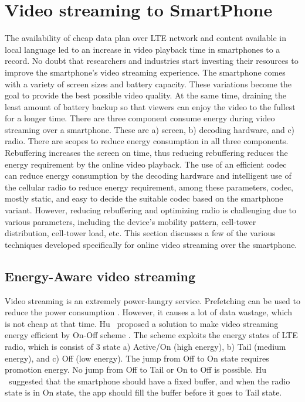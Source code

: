 \section{Video streaming to SmartPhone}
The availability of cheap data plan over LTE network and content available in local language led to an increase in video playback time in smartphones to a record. No doubt that researchers and industries start investing their resources to improve the smartphone's video streaming experience. The smartphone comes with a variety of screen sizes and battery capacity. These variations become the goal to provide the best possible video quality. At the same time, draining the least amount of battery backup so that viewers can enjoy the video to the fullest for a longer time. There are three component consume energy during video streaming over a smartphone. These are a) screen, b) decoding hardware, and c) radio. There are scopes to reduce energy consumption in all three components. Rebuffering increases the screen on time, thus reducing rebuffering reduces the energy requirement by the online video playback. The use of an efficient codec can reduce energy consumption by the decoding hardware and intelligent use of the cellular radio to reduce energy requirement, among these parameters, codec, mostly static, and easy to decide the suitable codec based on the smartphone variant. However, reducing rebuffering and optimizing radio is challenging due to various parameters, including the device's mobility pattern, cell-tower distribution, cell-tower load, etc. This section discusses a few of the various techniques developed specifically for online video streaming over the smartphone.

\subsection{Energy-Aware video streaming}
Video streaming is an extremely power-hungry service. Prefetching can be used to reduce the power consumption \cite{6681586,10.1145/2079296.2079321}. However, it causes a lot of data wastage, which is not cheap at that time. Hu \etal\ proposed a solution to make video streaming energy efficient by On-Off scheme \cite{7218493}. The scheme exploits the energy states of LTE radio, which is consist of 3 state a) Active/On (high energy), b) Tail (medium energy), and c) Off (low energy). The jump from Off to On state requires promotion energy. No jump from Off to Tail or On to Off is possible. Hu \etal\ suggested that the smartphone should have a fixed buffer, and when the radio state is in On state, the app should fill the buffer before it goes to Tail state.

